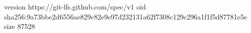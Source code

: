 version https://git-lfs.github.com/spec/v1
oid sha256:9a73bbe2d6556ae829c82e9e97d232131a62f7308c129c296a1f1f5d87781e5e
size 87528
